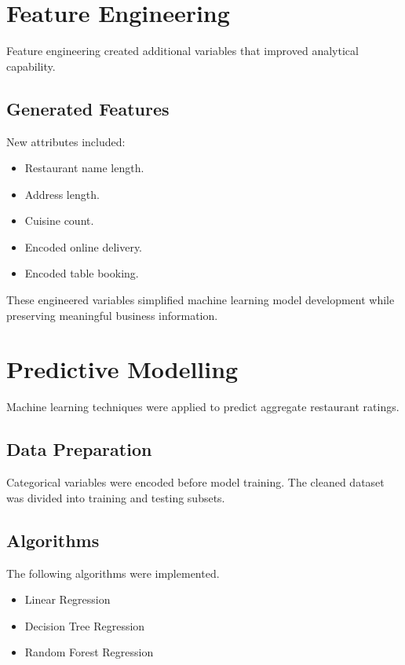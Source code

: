 \documentclass[12pt,a4paper]{report}
\begin{document}
\section{Feature Engineering}

Feature engineering created additional variables that improved analytical capability.

\subsection{Generated Features}

New attributes included:

\begin{itemize}
\item Restaurant name length.
\item Address length.
\item Cuisine count.
\item Encoded online delivery.
\item Encoded table booking.
\end{itemize}

These engineered variables simplified machine learning model development while preserving meaningful business information.


\section{Predictive Modelling}

Machine learning techniques were applied to predict aggregate restaurant ratings.

\subsection{Data Preparation}

Categorical variables were encoded before model training. The cleaned dataset was divided into training and testing subsets.

\subsection{Algorithms}

The following algorithms were implemented.

\begin{itemize}
\item Linear Regression
\item Decision Tree Regression
\item Random Forest Regression
\end{itemize}
\end{document}
